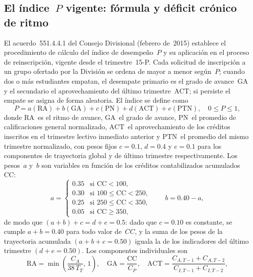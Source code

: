 \documentclass[11pt,letterpaper]{article}
\begin{document}
\subsection{El índice~\texorpdfstring{$P$}{P} vigente: fórmula y déficit crónico de ritmo}
\label{sec:P_vigente}

El acuerdo~551.4.4.1 del Consejo Divisional (febrero de~2015) establece el
procedimiento de cálculo del índice de desempeño~$P$ y su aplicación en el
proceso de reinscripción, vigente desde el trimestre~15-P.
Cada solicitud de inscripción a un grupo ofertado por la División se ordena de
mayor a menor según~$P$; cuando dos o más estudiantes empatan, el desempate
primario es el grado de avance~$\mathrm{GA}$ y el secundario el
aprovechamiento del último trimestre~$\mathrm{ACT}$; si persiste el empate se
asigna de forma aleatoria.
El índice se define como
\begin{equation}
  P = a(\mathrm{RA}) + b(\mathrm{GA}) + c(\mathrm{PN})
      + d(\mathrm{ACT}) + e(\mathrm{PTN}),
  \quad 0 \le P \le 1,
  \label{eq:indice_P}
\end{equation}
donde $\mathrm{RA}$~es el ritmo de avance, $\mathrm{GA}$~el grado de avance,
$\mathrm{PN}$~el promedio de calificaciones general normalizado,
$\mathrm{ACT}$~el aprovechamiento de los créditos inscritos en el trimestre
lectivo inmediato anterior y $\mathrm{PTN}$~el promedio del mismo trimestre
normalizado, con pesos fijos $c=0.1$, $d=0.4$ y $e=0.1$ para los componentes
de trayectoria global y de último trimestre respectivamente.
Los pesos~$a$ y~$b$ son variables en función de los créditos contabilizados
acumulados $\mathrm{CC}$:
\begin{equation}
  a =
  \begin{cases}
    0.35 & \text{si } \mathrm{CC} < 100, \\
    0.30 & \text{si } 100 \le \mathrm{CC} < 250, \\
    0.25 & \text{si } 250 \le \mathrm{CC} < 350, \\
    0.05 & \text{si } \mathrm{CC} \ge 350,
  \end{cases}
  \qquad
  b = 0.40 - a,
  \label{eq:pesos_ab}
\end{equation}
de modo que $(a+b)+c = d+e = 0.5$: dado que $c=0.10$ es
constante, se cumple $a+b=0.40$ para todo valor de~$CC$, y
la suma de los pesos de la trayectoria acumulada $(a+b+c=0.50)$
iguala la de los indicadores del último trimestre $(d+e=0.50)$.
Los componentes individuales son
\begin{equation}
  \mathrm{RA} = \min\!\left(\frac{C_A}{38\,T_T},\,1\right),
  \quad
  \mathrm{GA} = \frac{\mathrm{CC}}{C_P},
  \quad
  \mathrm{ACT} = \frac{C_{A,T-1}+C_{A,T-2}}{C_{I,T-1}+C_{I,T-2}},
  \label{eq:componentes_P}
\end{equation}
\end{document}

